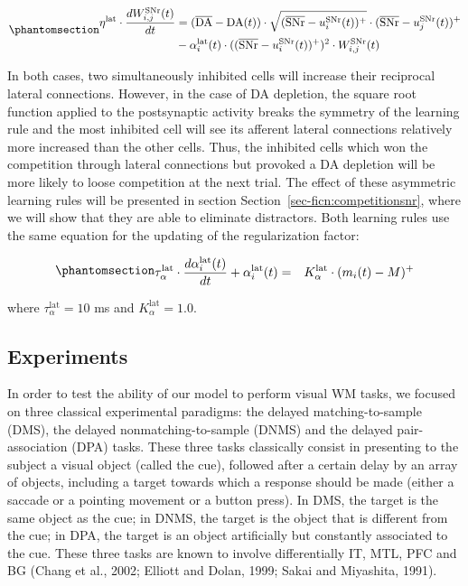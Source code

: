 \documentclass[
  11pt,
  a4paper,
]{scrbook}
\begin{document}
\begin{equation}\phantomsection\label{eq-ficn:latgpineg}{
\begin{aligned}
    \eta^{\text{lat}} \cdot \frac{d W^{\text{SNr}}_{i,j}(t)}{d t}  & = (\overline{\text{DA}} - \text{DA}(t)) \cdot \sqrt{( \overline{\text{SNr}} - u^{\text{SNr}}_i(t))^+}  \cdot ( \overline{\text{SNr}} - u^{\text{SNr}}_j(t))^+  \\
    &  - \alpha^{\text{lat}}_i(t) \cdot ( (\overline{\text{SNr}} -u^{\text{SNr}}_i(t) )^+ )^2 \cdot W^{\text{SNr}}_{i, j}(t)
\end{aligned}
}\end{equation}

In both cases, two simultaneously inhibited cells will increase their
reciprocal lateral connections. However, in the case of DA depletion,
the square root function applied to the postsynaptic activity breaks the
symmetry of the learning rule and the most inhibited cell will see its
afferent lateral connections relatively more increased than the other
cells. Thus, the inhibited cells which won the competition through
lateral connections but provoked a DA depletion will be more likely to
loose competition at the next trial. The effect of these asymmetric
learning rules will be presented in section
Section~\ref{sec-ficn:competitionsnr}, where we will show that they are
able to eliminate distractors. Both learning rules use the same equation
for the updating of the regularization factor:

\begin{equation}\phantomsection\label{eq-ficn:alphagpilat}{\begin{aligned}
    \tau^{\text{lat}}_{\alpha} \cdot \frac{d \alpha^{\text{lat}}_{i}(t)}{d t} + \alpha^{\text{lat}}_i(t) & = & K^{\text{lat}}_{\alpha} \cdot ( m_i(t) - M)^+ 
\end{aligned}
}\end{equation}

where \(\tau^{\text{lat}}_{\alpha} = 10\) ms and
\(K^{\text{lat}}_{\alpha} = 1.0\).

\subsection{Experiments}\label{sec-ficn:tasks}

In order to test the ability of our model to perform visual WM tasks, we
focused on three classical experimental paradigms: the delayed
matching-to-sample (DMS), the delayed nonmatching-to-sample (DNMS) and
the delayed pair-association (DPA) tasks. These three tasks classically
consist in presenting to the subject a visual object (called the cue),
followed after a certain delay by an array of objects, including a
target towards which a response should be made (either a saccade or a
pointing movement or a button press). In DMS, the target is the same
object as the cue; in DNMS, the target is the object that is different
from the cue; in DPA, the target is an object artificially but
constantly associated to the cue. These three tasks are known to involve
differentially IT, MTL, PFC and BG (Chang et al., 2002; Elliott and
Dolan, 1999; Sakai and Miyashita, 1991).
\end{document}
